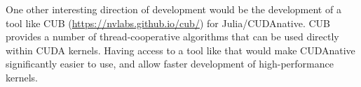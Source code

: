 \documentclass[12pt]{article}
\begin{document}
One other interesting direction of development would be the development of a tool like CUB (\url{https://nvlabs.github.io/cub/}) for Julia/CUDAnative. CUB provides a number of thread-cooperative algorithms that can be used directly within CUDA kernels. Having access to a tool like that would make CUDAnative significantly easier to use, and allow faster development of high-performance kernels.

\newpage


\end{document}

